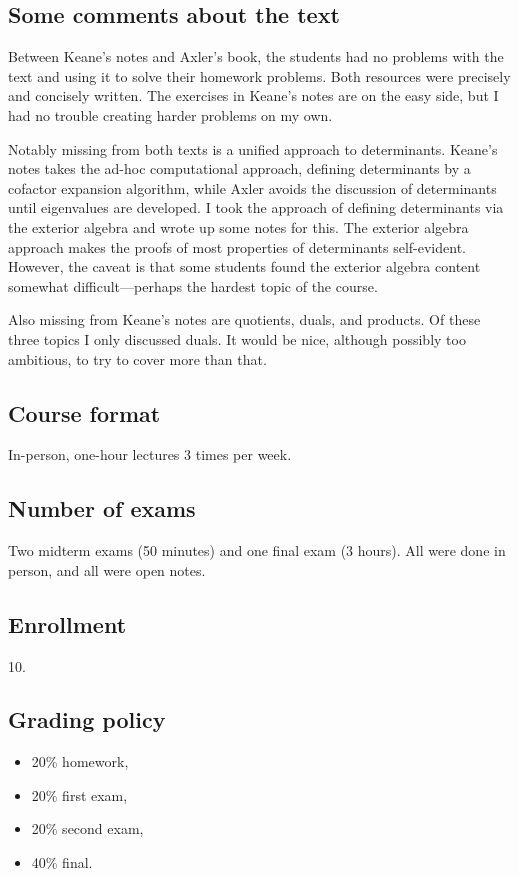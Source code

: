 \documentclass[11pt,oneside]{amsart}
\begin{document}
\subsection{Some comments about the text}
Between Keane's notes and Axler's book, the students had no problems with the text and using it to solve their homework problems. Both resources were precisely and concisely written. The exercises in Keane's notes are on the easy side, but I had no trouble creating harder problems on my own.

Notably missing from both texts is a unified approach to determinants. Keane's notes takes the ad-hoc computational approach, defining determinants by a cofactor expansion algorithm, while Axler avoids the discussion of determinants until eigenvalues are developed. I took the approach of defining determinants via the exterior algebra and wrote up some notes for this. The exterior algebra approach makes the proofs of most properties of determinants self-evident. However, the caveat is that some students found the exterior algebra content somewhat difficult---perhaps the hardest topic of the course.

Also missing from Keane's notes are quotients, duals, and products. Of these three topics I only discussed duals. It would be nice, although possibly too ambitious, to try to cover more than that.

\subsection{Course format}
In-person, one-hour lectures 3 times per week.

\subsection{Number of exams}
Two midterm exams (50 minutes) and one final exam (3 hours). All were done in person, and all were open notes.

\subsection{Enrollment}
10.

\subsection{Grading policy}
\begin{itemize}
    \item 20\% homework,
    \item 20\% first exam,
    \item 20\% second exam,
    \item 40\% final.
\end{itemize}
\end{document}
